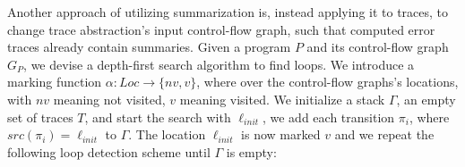 
\begin{comment}
	\jw{Introduction to Ultimate, Accelerated Inteprolation in Ultimate, Qvasr and Qvasrs libraries \\
	- Short introduction: what is Ultimate? $\rightarrow$ software verification framework with toolchains, such as trace abstraction \\
	- accelerated interpolation in ultimate $\rightarrow$ How does it work $\rightarrow$ get trace $\rightarrow$ loop detector $\rightarrow$ accelerator $\rightarrow$ meta trace transformer $\rightarrow$  interpolator (maybe as diagram) \\
	- Focus on qvasr $\rightarrow$ how does that library work? $\rightarrow$ same for qvasrs \\
	\vspace{1cm}
	15 pages}
\end{comment}

Another approach of utilizing \qvasr summarization is, instead applying it to traces, to change trace abstraction's input control-flow graph, such that computed error traces already contain summaries. Given a program $P$ and its control-flow graph $G_P$, we devise a depth-first search algorithm to find loops. We introduce a marking function $\alpha: Loc \rightarrow \{nv, v\}$, where over the control-flow graphs's locations, with $nv$ meaning not visited, $v$ meaning visited. We initialize a stack $\Gamma$, an empty set of traces $T$, and start the search with $\ell_{init}$, we add each transition $\pi_i$, where $src(\pi_i) = \ell_{init}$ to $\Gamma$. The location $\ell_{init}$ is now marked $v$ and we repeat the following loop detection scheme until $\Gamma$ is empty:

